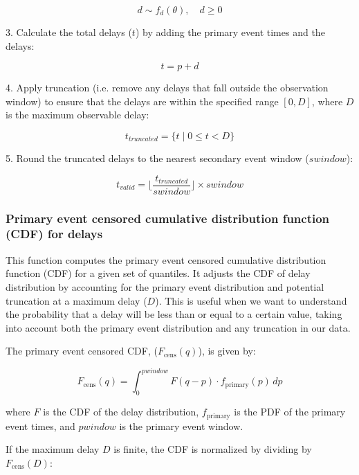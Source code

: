 \documentclass[10pt,letterpaper]{article}
\begin{document}
\begin{equation}d \sim f_d(\theta), \quad d \geq 0\end{equation}

3. Calculate the total delays ($t$) by adding the primary event times and the delays:

\begin{equation}t = p + d\end{equation}

4. Apply truncation (i.e. remove any delays that fall outside the observation window) to ensure that the delays are within the specified range $[0, D]$, where $D$ is the maximum observable delay:

\begin{equation}
t_{truncated} = \{t \mid 0 \leq t < D\}
\end{equation}

5. Round the truncated delays to the nearest secondary event window ($swindow$):

\begin{equation}t_{valid} = \lfloor \frac{t_{truncated}}{swindow} \rfloor \times swindow\end{equation}

\subsubsection{Primary event censored cumulative distribution function (CDF) for delays}

This function computes the primary event censored cumulative distribution function (CDF) for a given set of quantiles. It adjusts the CDF of delay distribution by accounting for the primary event distribution and potential truncation at a maximum delay ($D$). This is useful when we want to understand the probability that a delay will be less than or equal to a certain value, taking into account both the primary event distribution and any truncation in our data.

The primary event censored CDF, ($F_{\text{cens}}(q)$), is given by:

\begin{equation}
F_{\text{cens}}(q) = \int_{0}^{pwindow} F(q - p) \cdot f_{\text{primary}}(p) \, dp
\end{equation}

where $F$ is the CDF of the delay distribution, $f_{\text{primary}}$ is the PDF of the primary event times, and $pwindow$ is the primary event window.

If the maximum delay $D$ is finite, the CDF is normalized by dividing by $F_{\text{cens}}(D)$:
\end{document}
